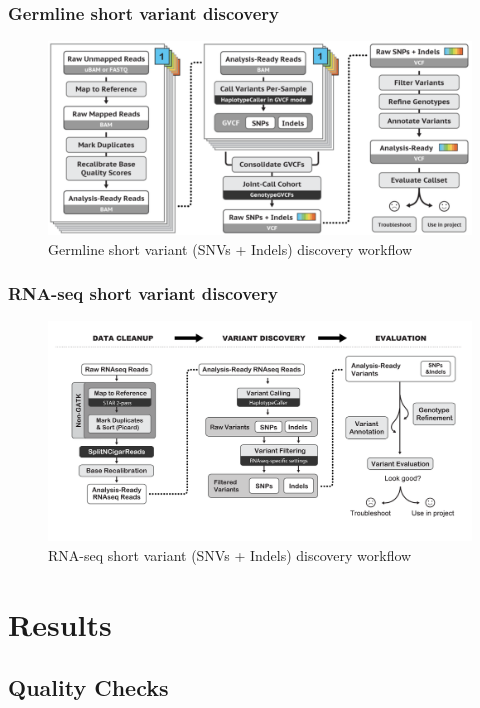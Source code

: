 \documentclass{beamer}
\begin{document}
    \begin{frame}
        \frametitle{Germline short variant discovery}

        \begin{figure}
            \includegraphics[width=0.7 \linewidth]{figures/Workflow/germline_short_variant.png}
            \caption{Germline short variant (SNVs + Indels) discovery workflow \protect\cite{gatk1, gatk2}}
        \end{figure}
    \end{frame}

    \begin{frame}
        \frametitle{RNA-seq short variant discovery}

        \begin{figure}
            \includegraphics[width=0.8 \linewidth]{figures/Workflow/RNA_short_variant.png}
            \caption{RNA-seq short variant (SNVs + Indels) discovery workflow \protect\cite{gatk1, gatk2}}
        \end{figure}
    \end{frame}

    \section{Results}
    \subsection{Quality Checks}
\end{document}

